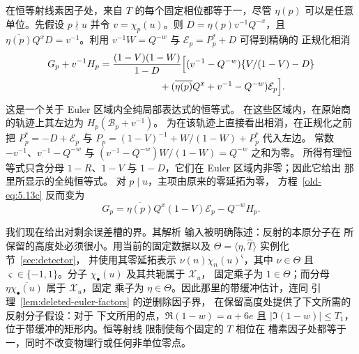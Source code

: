 \documentclass[11pt,a4paper]{article}
\numberwithin{equation}{section}
\numberwithin{figure}{section}
\theoremstyle{definition}
\theoremstyle{remark}
\begin{document}
在恒等射线素因子处，来自 $T$ 的每个固定相位都等于一，尽管
$\eta(p)$ 可以是任意单位。先假设 $p\nmid u$ 并令
$v=\chi_p(u)$。则 $D=\eta(p)v^{-1}Q^{-x}$，且
$\overline{\eta(p)}Q^xD=v^{-1}$。利用
$v^{-1}W=Q^{-w}$ 与 $\mathcal E_p=P_p^*+D$ 可得到精确的
正规化相消
\begin{equation}\label{old-eq:5.13b}
\begin{split}
 G_p+v^{-1}H_p={}&
 \frac{(1-V)(1-W)}{1-D}
 \Bigl[(v^{-1}-Q^{-w})\{V/(1-V)-D\}\\
 &\hspace{17mm}+(\overline{\eta(p)}Q^x+v^{-1}-Q^{-w})
                    \mathcal E_p\Bigr].
\end{split}
\end{equation}
这是一个关于 Euler 区域内全纯局部表达式的恒等式。
在这些区域内，在原始商的轨迹上其左边为
$H_p(\mathcal B_p+v^{-1})$。
为在该轨迹上直接看出相消，在正规化之前把
$P_p^*=-D+\mathcal E_p$ 与
$P_p=(1-V)^{-1}+W/(1-W)+P_p^*$ 代入左边。
常数 $-v^{-1}$、$v^{-1}-Q^{-w}$ 与
$(v^{-1}-Q^{-w})W/(1-W)=Q^{-w}$ 之和为零。
所得有理恒等式只含分母 $1-R$、$1-V$
与 $1-D$，它们在 Euler 区域内非零；因此它给出
那里所显示的全纯恒等式。
对 $p\mid u$，主项由原来的零延拓为零，
方程~\eqref{old-eq:5.13c} 反而变为
\[
 G_p=
 \overline{\eta(p)}Q^x(1-V)\mathcal E_p-Q^{-w}H_p.
\]

我们现在给出对剩余误差槽的界。其解析
输入被明确陈述：反射的本原分子在
所保留的高度处必须很小。用当前的固定数据以及
$\Theta=\langle\eta,\widehat T\rangle$ 实例化节~\ref{sec:detector}，
并使用其零延拓表示 $\nu(n)\chi_n(u)^\varsigma$，其中
$\nu\in\Theta$ 且 $\varsigma\in\{-1,1\}$。分子
$\chi_\bullet(u)$ 及其共轭属于 $\mathcal X_u$，
固定乘子为 $1\in\Theta$；而分母
$\eta\overline{\chi_\bullet(u)}$ 属于 $\mathcal X_u$，固定
乘子为 $\eta\in\Theta$。因此那里的带缓冲估计，连同
引理~\ref{lem:deleted-euler-factors} 的逆删除因子界，
在保留高度处提供了下文所需的反射分子假设：对于
下文所用的点，$\Re(1-w)=a+6e$ 且
$|\Im(1-w)|\le T_1$，位于带缓冲的矩形内。恒等射线
限制使每个固定的 $T$ 相位在
槽素因子处都等于一，同时不改变物理行或任何非单位零点。
\end{document}

